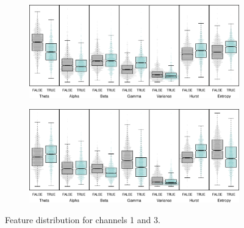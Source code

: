 \begin{figure}[!htbp]
  \begin{subfigure}[b]{ \textwidth}
  \includegraphics[width = \textwidth, keepaspectratio]{./figs/eeg-boxplot1.pdf}
  \end{subfigure} 
  \hfill
  \begin{subfigure}[b]{\textwidth}
  \includegraphics[width = \textwidth, keepaspectratio]{./figs/eeg-boxplotch3.pdf}
      \end{subfigure}
  \caption{Feature distribution for channels 1 and 3.}
  \label{fig:boxplot}
\end{figure}



